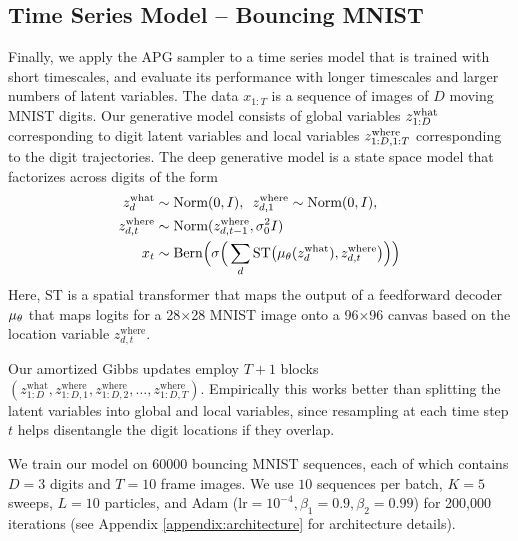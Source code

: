 \documentclass[anonymous=false, %
               format=acmsmall, %
               review=true, %
               screen=true, %
               nonacm=true]{acmart}
\theoremstyle{definition}
\begin{document}
\subsection{Time Series Model -- Bouncing MNIST}
Finally, we apply the APG sampler to a time series model that is trained with short timescales, and evaluate its performance with longer timescales and larger numbers of latent variables.
The data $x_{1:T}$ is a sequence of images of $D$ moving MNIST digits.
Our generative model consists of global variables $z_{1:D}^{\mathrm{what}}$ corresponding to digit latent variables and local variables $z_{1:D, 1:T}^{\mathrm{where}}$ corresponding to the digit trajectories.
The deep generative model is a state space model that factorizes across digits of the form
\begin{align*}
    z^{\mathrm{what}}_{d} 
    &\sim 
    \text{Norm}(0, I), 
    \,\,\, 
    z^{\mathrm{where}}_{d, 1} \sim \text{Norm}(0, I), 
    \\
    z^{\mathrm{where}}_{d, t} 
    &\sim 
    \text{Norm}(z^{\mathrm{where}}_{d, t - 1}, \sigma^2_0 I) 
    \\
    x_t 
    &\sim
    \mathrm{Bern}
    \Big(
        \sigma
        \Big(
            \sum_{d} \mathrm{ST}
            \big(
                \mu_\theta(z^{\mathrm{what}}_d), 
                z^{\mathrm{where}}_{d, t}
            \big)
        \Big)
    \Big)
\end{align*}
Here, ST is a spatial transformer \cite{jaderberg2015spatial} that maps the output of a feedforward decoder $\mu_\theta$ that maps logits for a 28$\times$28 MNIST image onto a 96$\times$96 canvas based on the location variable $z^{\mathrm{where}}_{d, t}$. 

Our amortized Gibbs updates employ $T + 1$ blocks $(z_{1:D}^{\mathrm{what}}, z_{1:D, 1}^{\mathrm{where}}, z_{1:D, 2}^{\mathrm{where}}, \dotsc, z_{1:D, T}^{\mathrm{where}})$.
Empirically this works better than splitting the latent variables into global and local variables, since resampling at each time step $t$ helps disentangle the digit locations if they overlap.

We train our model on 60000 bouncing MNIST sequences, each of which contains $D=3$ digits and $T=10$ frame images. We use $10$ sequences per batch, $K=5$ sweeps, $L=10$ particles, and Adam ($\mathrm{lr} = 10^{-4}, \beta_1 = 0.9, \beta_2 = 0.99$) for 200,000 iterations (see Appendix \ref{appendix:architecture} for architecture details).
\end{document}
